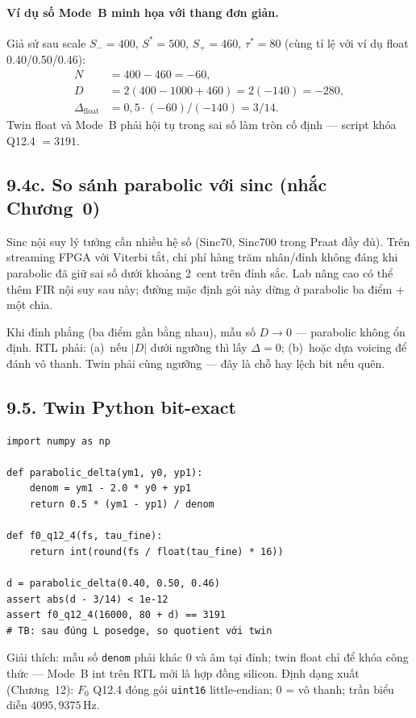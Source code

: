 \paragraph{Ví dụ số Mode~B minh họa với thang đơn giản.}
Giả sử sau scale $S_{-}=400$, $S^{*}=500$, $S_{+}=460$, $\tau^{*}=80$ (cùng tỉ lệ với ví dụ float 0.40/0.50/0.46):
\begin{align*}
N &= 400-460 = -60,\\
D &= 2(400-1000+460) = 2(-140) = -280,\\
\Delta_{\mathrm{float}} &= 0{,}5\cdot(-60)/(-140) = 3/14.
\end{align*}
Twin float và Mode~B phải hội tụ trong sai số làm tròn cố định --- script khóa Q12.4 $=3191$.

\subsection*{9.4c. So sánh parabolic với sinc (nhắc Chương~0)}

Sinc nội suy lý tưởng cần nhiều hệ số (Sinc70, Sinc700 trong Praat đầy đủ). Trên streaming FPGA với Viterbi tắt, chi phí hàng trăm nhân/đỉnh không đáng khi parabolic đã giữ sai số dưới khoảng 2~cent trên đỉnh sắc. Lab nâng cao có thể thêm FIR nội suy sau này; đường mặc định gói này dừng ở parabolic ba điểm + một chia.

Khi đỉnh phẳng (ba điểm gần bằng nhau), mẫu số $D\to 0$ --- parabolic không ổn định. RTL phải: (a)~nếu $|D|$ dưới ngưỡng thì lấy $\Delta=0$; (b)~hoặc dựa voicing để đánh vô thanh. Twin phải cùng ngưỡng --- đây là chỗ hay lệch bit nếu quên.

\subsection*{9.5. Twin Python bit-exact}

\begin{verbatim}
import numpy as np

def parabolic_delta(ym1, y0, yp1):
    denom = ym1 - 2.0 * y0 + yp1
    return 0.5 * (ym1 - yp1) / denom

def f0_q12_4(fs, tau_fine):
    return int(round(fs / float(tau_fine) * 16))

d = parabolic_delta(0.40, 0.50, 0.46)
assert abs(d - 3/14) < 1e-12
assert f0_q12_4(16000, 80 + d) == 3191
# TB: sau đúng L posedge, so quotient với twin
\end{verbatim}
Giải thích: mẫu số \texttt{denom} phải khác 0 và âm tại đỉnh; twin float chỉ để khóa công thức --- Mode~B int trên RTL mới là hợp đồng silicon. Định dạng xuất (Chương~12): $F_0$ Q12.4 đóng gói \texttt{uint16} little-endian; $0$ = vô thanh; trần biểu diễn $4095{,}9375\,\text{Hz}$.


